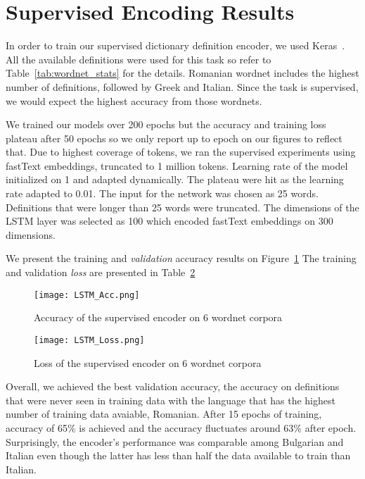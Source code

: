\section{Supervised Encoding Results}%
\label{sec:supervised_encoding_results}

In order to train our supervised dictionary definition encoder, we used Keras~\cite{chollet_keras_2015}.
All the available definitions were used for this task so refer to Table~\ref{tab:wordnet_stats} for the details.
Romanian wordnet includes the highest number of definitions, followed by Greek and Italian.
Since the task is supervised, we would expect the highest accuracy from those wordnets.

We trained our models over 200 epochs but the accuracy and training loss plateau after 50 epochs so we only report up to  epoch on our figures to reflect that.
Due to highest coverage of tokens, we ran the supervised experiments using fastText embeddings, truncated to 1 million tokens.
Learning rate of the model initialized on 1 and adapted dynamically.
The plateau were hit as the learning rate adapted to 0.01.
The input for the network was chosen as 25 words.
Definitions that were longer than 25 words were truncated.
The dimensions of the LSTM layer was selected as 100 which encoded fastText embeddings on 300 dimensions.

We present the training and \emph{validation} accuracy results on Figure~\ref{fig:LSTM_Acc}
The training and validation \emph{loss} are presented in Table~\ref{fig:LSTM_loss}

\begin{figure}[htpb]
    \centering
    \texttt{[image: LSTM\_Acc.png]}
    \caption{Accuracy of the supervised encoder on 6 wordnet corpora}%
    \label{fig:LSTM_Acc}
\end{figure}


\begin{figure}[htpb]
    \centering
    \texttt{[image: LSTM\_Loss.png]}
    \caption{Loss of the supervised encoder on 6 wordnet corpora}%
    \label{fig:LSTM_loss}
\end{figure}

Overall, we achieved the best validation accuracy, the accuracy on definitions that were never seen in training data with the language that has the highest number of training data avaiable, Romanian.
After 15 epochs of training, accuracy of 65\% is achieved and the accuracy fluctuates around 63\% after  epoch.
Surprisingly, the encoder's performance was comparable among Bulgarian and Italian even though the latter has less than half the data available to train than Italian.

